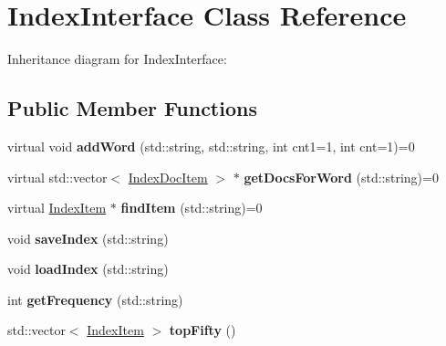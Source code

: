 \hypertarget{classIndexInterface}{}\section{Index\+Interface Class Reference}
\label{classIndexInterface}


Inheritance diagram for Index\+Interface\+:
\subsection*{Public Member Functions}
\begin{DoxyCompactItemize}
\item 
virtual void {\bfseries add\+Word} (std\+::string, std\+::string, int cnt1=1, int cnt=1)=0\hypertarget{classIndexInterface_a45fa70347785ee9aa9343c5fc51a3a08}{}\label{classIndexInterface_a45fa70347785ee9aa9343c5fc51a3a08}

\item 
virtual std\+::vector$<$ \hyperlink{classIndexDocItem}{Index\+Doc\+Item} $>$ $\ast$ {\bfseries get\+Docs\+For\+Word} (std\+::string)=0\hypertarget{classIndexInterface_a68ca8b30b5a15cbe38a0629030560a55}{}\label{classIndexInterface_a68ca8b30b5a15cbe38a0629030560a55}

\item 
virtual \hyperlink{classIndexItem}{Index\+Item} $\ast$ {\bfseries find\+Item} (std\+::string)=0\hypertarget{classIndexInterface_a9e054285693e5e5390de36b9b56c4ebd}{}\label{classIndexInterface_a9e054285693e5e5390de36b9b56c4ebd}

\item 
void {\bfseries save\+Index} (std\+::string)\hypertarget{classIndexInterface_a0c53dbfdb56c9efbdd14c48e4e32da66}{}\label{classIndexInterface_a0c53dbfdb56c9efbdd14c48e4e32da66}

\item 
void {\bfseries load\+Index} (std\+::string)\hypertarget{classIndexInterface_a67e9ee54cd23e60c0a3faee6a6a93899}{}\label{classIndexInterface_a67e9ee54cd23e60c0a3faee6a6a93899}

\item 
int {\bfseries get\+Frequency} (std\+::string)\hypertarget{classIndexInterface_a073286dfbe825980d4d586e6cc440b90}{}\label{classIndexInterface_a073286dfbe825980d4d586e6cc440b90}

\item 
std\+::vector$<$ \hyperlink{classIndexItem}{Index\+Item} $>$ {\bfseries top\+Fifty} ()\hypertarget{classIndexInterface_ae814b191817420d68c761706ed91d444}{}\label{classIndexInterface_ae814b191817420d68c761706ed91d444}


\end{DoxyCompactItemize}
